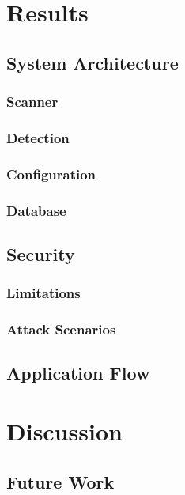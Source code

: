 \documentclass[
	a4paper,					%
	10pt,							%
	twoside,					%
	openright,				%
	notitlepage,			%
	parskip=half,			%
]{scrreprt}					%
\begin{document}
\chapter{Results}

\section{System Architecture}

\subsection{Scanner}

\subsection{Detection}

\subsection{Configuration}

\subsection{Database}

\section{Security}

\subsection{Limitations}

\subsection{Attack Scenarios}
\label{sec:attack_scenarios}

\section{Application Flow}

\chapter{Discussion}

\section{Future Work}
\end{document}
